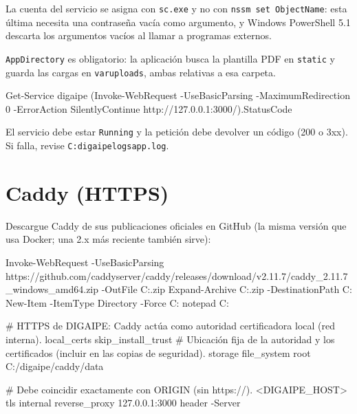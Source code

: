 La cuenta del servicio se asigna con \texttt{sc.exe} y no con \texttt{nssm set ObjectName}:
esta última necesita una contraseña vacía como argumento, y Windows PowerShell 5.1 descarta los
argumentos vacíos al llamar a programas externos.

\texttt{AppDirectory} es obligatorio: la aplicación busca la plantilla PDF en \texttt{static}
y guarda las cargas en \texttt{var\bs uploads}, ambas relativas a esa carpeta.

\begin{comprobar}
	\begin{codigo}
Get-Service digaipe
(Invoke-WebRequest -UseBasicParsing -MaximumRedirection 0 -ErrorAction SilentlyContinue http://127.0.0.1:3000/).StatusCode
	\end{codigo}
	El servicio debe estar \texttt{Running} y la petición debe devolver un código (200 o 3xx). Si
	falla, revise \texttt{C:\bs digaipe\bs logs\bs app.log}.
\end{comprobar}

\section{Caddy (HTTPS)}

Descargue Caddy de sus publicaciones oficiales en GitHub (la misma versión que usa Docker; una
2.x más reciente también sirve):

\begin{codigo}
Invoke-WebRequest -UseBasicParsing https://github.com/caddyserver/caddy/releases/download/v2.11.7/caddy_2.11.7_windows_amd64.zip -OutFile C:\digaipe\descargas\caddy.zip
Expand-Archive C:\digaipe\descargas\caddy.zip -DestinationPath C:\digaipe\caddy
New-Item -ItemType Directory -Force C:\digaipe\caddy\data
notepad C:\digaipe\caddy\Caddyfile
\end{codigo}

\begin{codigo}[label={C:\textbackslash digaipe\textbackslash caddy\textbackslash Caddyfile}]
# HTTPS de DIGAIPE: Caddy actúa como autoridad certificadora local (red interna).
{
	local_certs
	skip_install_trust
	# Ubicación fija de la autoridad y los certificados (incluir en las copias de seguridad).
	storage file_system {
		root C:/digaipe/caddy/data
	}
}

# Debe coincidir exactamente con ORIGIN (sin https://).
<DIGAIPE_HOST> {
	tls internal
	reverse_proxy 127.0.0.1:3000
	header -Server
}
\end{codigo}


